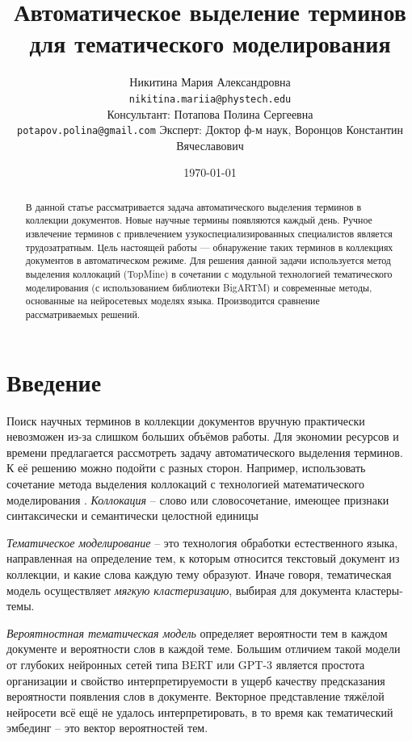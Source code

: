 \documentclass[a4paper, 12pt]{article}
\title{Автоматическое выделение терминов для тематического моделирования}
\author{
    Никитина Мария Александровна \\
	\texttt{nikitina.mariia@phystech.edu} \\
	\And
	Консультант: Потапова Полина Сергеевна \\
	\texttt{potapov.polina@gmail.com}
 	\And
	Эксперт: Доктор ф-м наук, Воронцов Константин Вячеславович
}
\date{\today}
\begin{document}
\maketitle

\begin{abstract}
В данной статье рассматривается задача автоматического выделения терминов в коллекции документов. Новые научные термины появляются каждый день.
Ручное извлечение терминов с привлечением узукоспециализированных
специалистов является трудозатратным. Цель настоящей работы --- обнаружение таких терминов в коллекциях документов в автоматическом режиме. Для решения данной задачи используется метод выделения коллокаций (TopMine) в сочетании с модульной технологией тематического моделирования (с использованием библиотеки BigARTM) и современные методы, основанные на нейросетевых моделях языка. Производится сравнение рассматриваемых решений.
\end{abstract}


\section{Введение}

        Поиск научных терминов в коллекции документов вручную практически невозможен из-за слишком больших объёмов работы. Для экономии ресурсов и времени предлагается рассмотреть задачу автоматического выделения терминов. К её решению можно подойти с разных сторон. Например, использовать сочетание метода выделения коллокаций с технологией математического моделирования \citep{ElKishky2014}. \textit{Коллокация} -- слово или словосочетание, имеющее признаки синтаксически и семантически целостной единицы

        \textit{Тематическое моделирование} -- это технология обработки естественного языка, направленная на определение тем, к которым относится текстовый документ из коллекции, и какие слова каждую тему образуют. Иначе говоря, тематическая модель осуществляет \textit{мягкую кластеризацию}, выбирая для документа кластеры-темы.

        \textit{Вероятностная тематическая модель} определяет вероятности тем в каждом документе и вероятности слов в каждой теме. Большим отличием такой модели от глубоких нейронных сетей типа BERT \citep{bert} или GPT-3 \citep{Brown2020LanguageMA} является простота организации и свойство интерпретируемости в ущерб качеству предсказания вероятности появления слов в документе. Векторное представление тяжёлой нейросети всё ещё не удалось интерпретировать, в то время как тематический эмбединг -- это вектор вероятностей тем.
\end{document}

